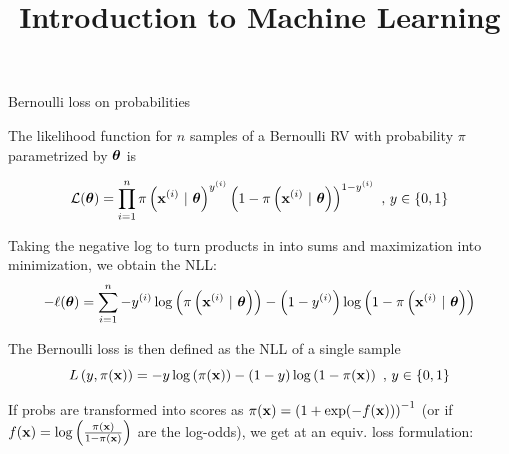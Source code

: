 \documentclass[11pt,compress,t,notes=noshow, xcolor=table]{beamer}
\title{Introduction to Machine Learning}
\begin{document}
    

\begin{vbframe}{Bernoulli loss on probabilities}

The likelihood function for $n$ samples of a Bernoulli RV with probability $\pi$ parametrized by $\bm{\theta}$ is



$$
\mathcal{L}(\bm{\theta}) = \prod\limits_{i=1}^n \pi\left(\mathbf{x}^{(i)} ~|~ \bm{\theta}\right)^{y^{(i)}} \left(1-\pi\left(\mathbf{x}^{(i)} ~|~ \bm{\theta}\right)\right)^{1-y^{(i)}} \,\,, \, y \in \{0, 1\}
$$

Taking the negative log to turn products in into sums and maximization into minimization, we obtain the NLL:
$$- \ell(\bm{\theta}) = \sum\limits_{i=1}^n - y^{(i)} \log\left(\pi\left(\mathbf{x}^{(i)} ~|~ \bm{\theta}\right)\right) - \left(1-y^{(i)}\right)\log\left(1-\pi\left(\mathbf{x}^{(i)} ~|~ \bm{\theta}\right)\right)$$

The Bernoulli loss is then defined as the NLL of a single sample
  $$
    L\left(y, \pi(\mathbf{x})\right) = - y \log \left(\pi(\mathbf{x})\right) - (1 - y) \log \left(1 - \pi(\mathbf{x})\right)\,\,, \, y \in \{0, 1\} 
  $$

\framebreak 

If probs are transformed into scores as $\pi(\mathbf{x}) = \left(1 + \exp(-f(\mathbf{x}))\right)^{-1}$ (or if $f(\mathbf{x}) = \log\left(\frac{\pi(\mathbf{x})}{1 - \pi(\mathbf{x})}\right)$ are the log-odds), we get at an equiv. loss formulation:


\end{vbframe}
\end{document}
